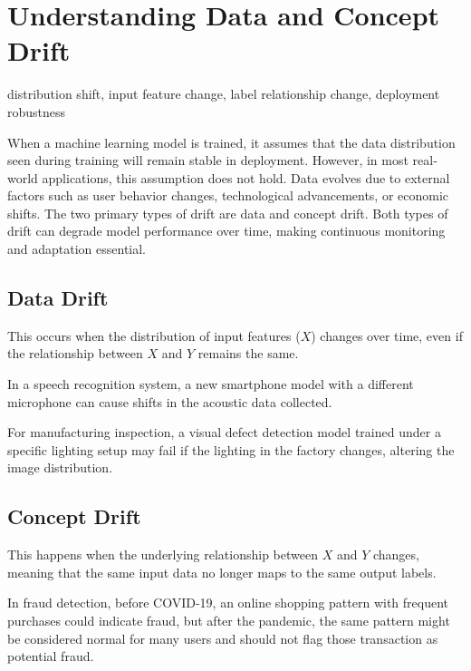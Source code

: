 \documentclass[12pt,openany]{book}
\begin{document}
\section{Understanding Data and Concept Drift}

\begin{keywordsbox}
distribution shift, input feature change, label relationship change, deployment robustness
\end{keywordsbox}

When a machine learning model is trained, it assumes that the data distribution seen during training will remain stable in deployment. However, in most real-world applications, this assumption does not hold. Data evolves due to external factors such as user behavior changes, technological advancements, or economic shifts. The two primary types of drift are data and concept drift. Both types of drift can degrade model performance over time, making continuous monitoring and adaptation essential.


\subsection{Data Drift}

This occurs when the distribution of input features (\(X\)) changes over time, even if the relationship between \(X\) and \(Y\) remains the same. 

\begin{examplebox}
    In a speech recognition system, a new smartphone model with a different microphone can cause shifts in the acoustic data collected.
\end{examplebox}

\begin{examplebox}
    For manufacturing inspection, a visual defect detection model trained under a specific lighting setup may fail if the lighting in the factory changes, altering the image distribution.
\end{examplebox}


\subsection{Concept Drift}

This happens when the underlying relationship between \(X\) and \(Y\) changes, meaning that the same input data no longer maps to the same output labels.
    
\begin{examplebox}
     In fraud detection, before COVID-19, an online shopping pattern with frequent purchases could indicate fraud, but after the pandemic, the same pattern might be considered normal for many users and should not flag those transaction as potential fraud.
\end{examplebox}
\end{document}
